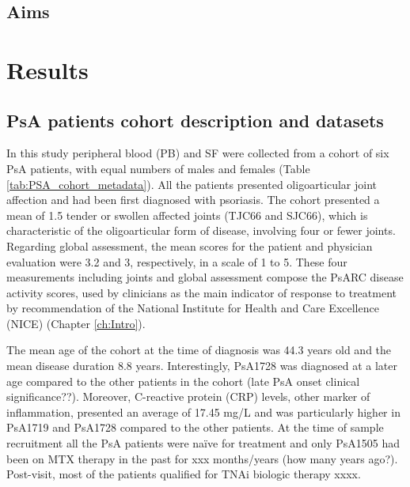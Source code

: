 \subsection{Aims}



\section{Results}
%

\subsection{PsA patients cohort description and datasets}
In this study peripheral blood (PB) and SF were collected from a cohort of six PsA patients, with equal numbers of males and females (Table \ref{tab:PSA_cohort_metadata}). All the patients presented oligoarticular joint affection and had been first diagnosed with psoriasis. The cohort presented a mean of 1.5 tender or swollen affected joints (TJC66 and SJC66), which is characteristic of the oligoarticular form of disease, involving four or fewer joints. Regarding global assessment, the mean scores for the patient and physician evaluation were 3.2 and 3, respectively, in a scale of 1 to 5. These four measurements including joints and global assessment compose the PsARC disease activity scores, used by clinicians as the main indicator of response to treatment by recommendation of the National Institute for Health and Care Excellence (NICE) (Chapter \ref{ch:Intro}). 

The mean age of the cohort at the time of diagnosis was 44.3 years old and the mean disease duration 8.8 years. Interestingly, PsA1728 was diagnosed at a later age compared to the other patients in the cohort (late PsA onset clinical significance??). Moreover, C-reactive protein (CRP) levels, other marker of inflammation, presented an average of 17.45 mg/L and was particularly higher in PsA1719 and PsA1728 compared to the other patients. At the time of sample recruitment all the PsA patients were na\"{i}ve for treatment and only PsA1505 had been on MTX therapy in the past for xxx months/years (how many years ago?). Post-visit, most of the patients qualified for TNAi biologic therapy xxxx.


